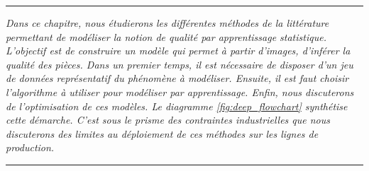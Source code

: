 %
%


\begin{center}
	\rule{0.7\linewidth}{.5pt}
	\begin{minipage}{0.7\linewidth}
		\smallskip
		
		\textit{
			Dans ce chapitre, nous étudierons les différentes méthodes de la littérature permettant de modéliser la notion de qualité par apprentissage statistique.
			L'objectif est de construire un modèle qui permet à partir d'images, d'inférer la qualité des pièces.
			Dans un premier temps, il est nécessaire de disposer d'un jeu de données représentatif du phénomène à modéliser.
			Ensuite, il est faut choisir l'algorithme à utiliser pour modéliser par apprentissage.
			Enfin, nous discuterons de l'optimisation de ces modèles.
			Le diagramme \ref{fig:deep_flowchart} synthétise cette démarche.
			C'est sous le prisme des contraintes industrielles que nous discuterons des limites au déploiement de ces méthodes sur les lignes de production.
		}
		
	\end{minipage}
	\smallskip
	\rule{0.7\linewidth}{.5pt}
\end{center}

\minitoc

\newpage
\null
\vfill

